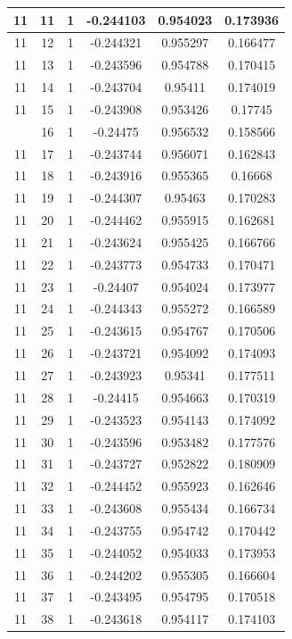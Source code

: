 \documentclass[12pt,a4paper]{article}
\numberwithin{equation}{section}
\numberwithin{figure}{section}
\numberwithin{table}{section}
\begin{document}
\begin{longtable}{|c|c|c|c|c|c|}
11 & 11 & 1 & -0.244103 & 0.954023 & 0.173936 \\ \hline
11 & 12 & 1 & -0.244321 & 0.955297 & 0.166477 \\ \hline
11 & 13 & 1 & -0.243596 & 0.954788 & 0.170415 \\ \hline
11 & 14 & 1 & -0.243704 & 0.95411 & 0.174019 \\ \hline
11 & 15 & 1 & -0.243908 & 0.953426 & 0.17745 \\ \hline
\pagebreak
11 & 16 & 1 & -0.24475 & 0.956532 & 0.158566 \\ \hline
11 & 17 & 1 & -0.243744 & 0.956071 & 0.162843 \\ \hline
11 & 18 & 1 & -0.243916 & 0.955365 & 0.16668 \\ \hline
11 & 19 & 1 & -0.244307 & 0.95463 & 0.170283 \\ \hline
11 & 20 & 1 & -0.244462 & 0.955915 & 0.162681 \\ \hline
11 & 21 & 1 & -0.243624 & 0.955425 & 0.166766 \\ \hline
11 & 22 & 1 & -0.243773 & 0.954733 & 0.170471 \\ \hline
11 & 23 & 1 & -0.24407 & 0.954024 & 0.173977 \\ \hline
11 & 24 & 1 & -0.244343 & 0.955272 & 0.166589 \\ \hline
11 & 25 & 1 & -0.243615 & 0.954767 & 0.170506 \\ \hline
11 & 26 & 1 & -0.243721 & 0.954092 & 0.174093 \\ \hline
11 & 27 & 1 & -0.243923 & 0.95341 & 0.177511 \\ \hline
11 & 28 & 1 & -0.24415 & 0.954663 & 0.170319 \\ \hline
11 & 29 & 1 & -0.243523 & 0.954143 & 0.174092 \\ \hline
11 & 30 & 1 & -0.243596 & 0.953482 & 0.177576 \\ \hline
11 & 31 & 1 & -0.243727 & 0.952822 & 0.180909 \\ \hline
11 & 32 & 1 & -0.244452 & 0.955923 & 0.162646 \\ \hline
11 & 33 & 1 & -0.243608 & 0.955434 & 0.166734 \\ \hline
11 & 34 & 1 & -0.243755 & 0.954742 & 0.170442 \\ \hline
11 & 35 & 1 & -0.244052 & 0.954033 & 0.173953 \\ \hline
11 & 36 & 1 & -0.244202 & 0.955305 & 0.166604 \\ \hline
11 & 37 & 1 & -0.243495 & 0.954795 & 0.170518 \\ \hline
11 & 38 & 1 & -0.243618 & 0.954117 & 0.174103 \\ \hline

\end{longtable}
\end{document}

